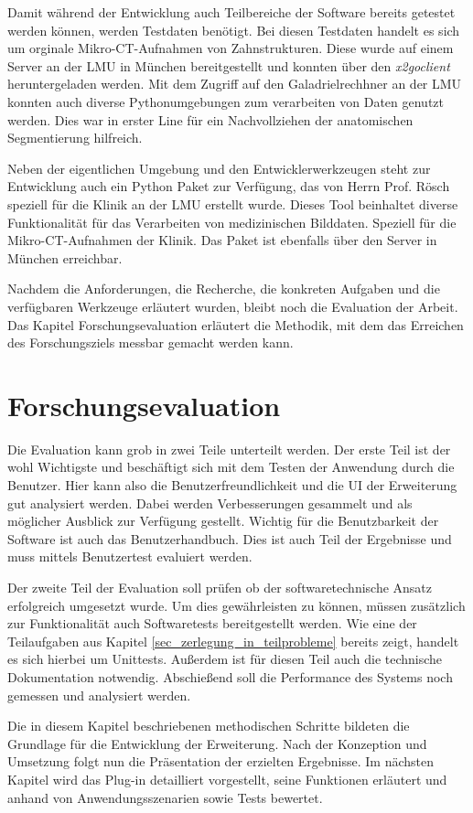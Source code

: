 Damit während der Entwicklung auch Teilbereiche der Software bereits getestet
werden können, werden Testdaten benötigt. Bei diesen Testdaten handelt es sich
um orginale Mikro-CT-Aufnahmen von Zahnstrukturen. Diese wurde auf einem Server an
der \ac{LMU} in München bereitgestellt und konnten über den \textit{x2goclient} heruntergeladen
werden. Mit dem Zugriff auf den Galadrielrechhner an der \ac{LMU} konnten auch diverse
Pythonumgebungen zum verarbeiten von Daten genutzt werden. Dies war in erster
Line für ein Nachvollziehen der anatomischen Segmentierung hilfreich.

Neben der eigentlichen Umgebung und den Entwicklerwerkzeugen steht zur
Entwicklung auch ein Python Paket zur Verfügung, das von Herrn Prof. Rösch
speziell für die Klinik an der \ac{LMU} erstellt wurde. Dieses Tool beinhaltet
diverse Funktionalität für das Verarbeiten von medizinischen Bilddaten. Speziell
für die Mikro-CT-Aufnahmen der Klinik. Das Paket ist ebenfalls über den Server
in München erreichbar.

Nachdem die Anforderungen, die Recherche, die konkreten Aufgaben und die
verfügbaren Werkzeuge erläutert wurden, bleibt noch die Evaluation der Arbeit.
Das Kapitel Forschungsevaluation erläutert die Methodik, mit dem das Erreichen des
Forschungsziels messbar gemacht werden kann.


\section{Forschungsevaluation}
Die Evaluation kann grob in zwei Teile unterteilt werden. Der erste Teil ist der
wohl Wichtigste und beschäftigt sich mit dem Testen der Anwendung durch die Benutzer.
Hier kann also die Benutzerfreundlichkeit und die \ac{UI} der Erweiterung gut analysiert
werden. Dabei werden Verbesserungen gesammelt und als möglicher Ausblick zur
Verfügung gestellt. Wichtig für die Benutzbarkeit der Software ist auch das Benutzerhandbuch.
Dies ist auch Teil der Ergebnisse und muss mittels Benutzertest evaluiert werden.

Der zweite Teil der Evaluation soll prüfen ob der softwaretechnische Ansatz
erfolgreich umgesetzt wurde. Um dies gewährleisten zu können, müssen zusätzlich
zur Funktionalität auch Softwaretests bereitgestellt werden. Wie eine der Teilaufgaben
aus Kapitel \ref{sec_zerlegung_in_teilprobleme} bereits zeigt, handelt es sich
hierbei um Unittests. Außerdem ist für diesen Teil auch die technische Dokumentation
notwendig. Abschießend soll die Performance des Systems noch gemessen und
analysiert werden.

Die in diesem Kapitel beschriebenen methodischen Schritte bildeten die Grundlage
für die Entwicklung der Erweiterung. Nach der Konzeption und Umsetzung folgt nun
die Präsentation der erzielten Ergebnisse. Im nächsten Kapitel wird das Plug-in
detailliert vorgestellt, seine Funktionen erläutert und anhand von Anwendungsszenarien
sowie Tests bewertet.
